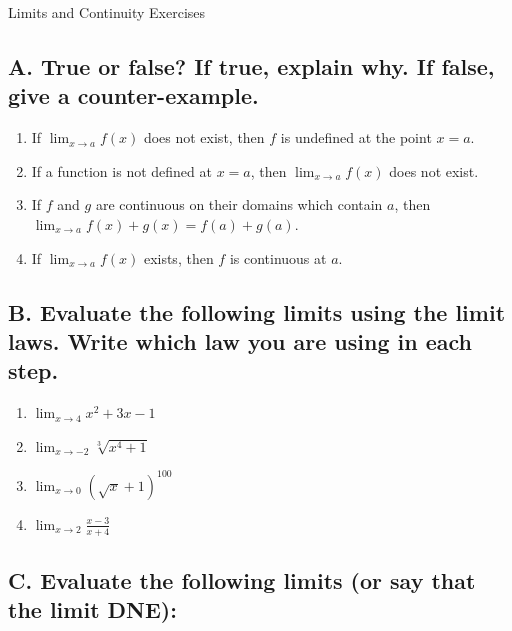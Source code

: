 \documentclass{article}
\begin{document}
\begin{center}
\begin{Huge}Limits and Continuity Exercises\end{Huge}
\end{center}


\subsection*{A. True or false? If true, explain why. If false, give a counter-example.}
\begin{enumerate}
\item If $\displaystyle\lim_{x\to a} f(x)$ does not exist, then $f$ is undefined at the point $x=a$.
\item If a function is not defined at $x=a$, then $\displaystyle\lim_{x\to a} f(x)$ does not exist.
\item If $f$ and $g$ are continuous on their domains which contain $a$, then $\displaystyle\lim_{x\to a} f(x) + g(x) = f(a) + g(a).$
\item If $\displaystyle\lim_{x\to a} f(x)$ exists, then $f$ is continuous at $a$.
\end{enumerate}

\subsection*{B. Evaluate the following limits using the limit laws. Write which law you are using in each step.}
\begin{multicols}{4}
\begin{enumerate}
    \item $\displaystyle\lim_{x\to4}x^2+3x-1$
    \item $\displaystyle\lim_{x\to-2}\sqrt[3]{x^4+1}$
    \item $\displaystyle\lim_{x\to 0}\left(\sqrt{x}+1\right)^{100}$
    \item $\displaystyle\lim_{x\to2}\frac{x-3}{x+4}$
\end{enumerate}
\end{multicols}


\subsection*{C. Evaluate the following limits (or say that the limit DNE):}
\end{document}
